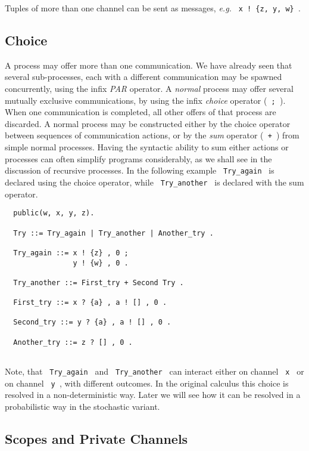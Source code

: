 \noindent
Tuples of more than one channel can be sent as messages, {\em e.g.}
\verb+ x ! {z, y, w} +. 

\subsection{Choice}

A process may offer more than one communication.  We have already seen
that several sub-processes, each with a different communication may
be spawned concurrently, using the infix {\em PAR} operator. A
{\em normal} process may offer several mutually exclusive
communications, by using the infix {\em choice} operator (\verb+ ; +).
When one communication is completed, all other offers of that process 
are discarded.
A normal process may be constructed either by the choice operator
between sequences of communication actions, or by the {\em sum}
operator (\verb- + -) from simple normal processes. Having the
syntactic ability to
sum either actions or processes can often simplify programs
considerably, as we shall see in the discussion of recursive processes.
In the following example \verb+ Try_again + is declared using the choice
operator, while \verb+ Try_another + is declared with the sum operator.


\begin{verbatim}
  public(w, x, y, z).

  Try ::= Try_again | Try_another | Another_try .

  Try_again ::= x ! {z} , 0 ;
                y ! {w} , 0 .

  Try_another ::= First_try + Second Try .

  First_try ::= x ? {a} , a ! [] , 0 .

  Second_try ::= y ? {a} , a ! [] , 0 .

  Another_try ::= z ? [] , 0 .
 
\end{verbatim}

\noindent
Note, that \verb+ Try_again + and \verb+ Try_another + can interact
either on channel \verb+ x + or on channel \verb+ y +, with different
outcomes.  In the original calculus this choice is resolved in a
non-deterministic way.  Later we will see how it can be resolved in a
probabilistic way in the stochastic variant.

\subsection{Scopes and Private Channels}

